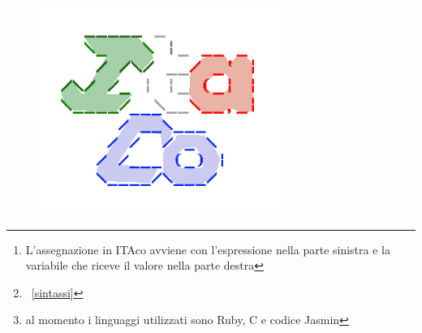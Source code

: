 \documentclass[11pt, a4paper, twoside, notitlepage]{report}
\begin{document}
\thispagestyle{empty} %
\clearpage
\begin{figure}[h] \hspace*{140pt}
\includegraphics[scale=0.5]{img/itaco_logo.png}
\end{figure}
\begin{abstract}
Questo documento riassume brevemente le peculiarità principali del progetto
ITAco da un punto di vista interessato alla dimostrazione ai fini accademici
delle competenze acquisite dagli autori dello stesso nell'ambito della creazione
di linguaggi e compilatori.
\\Il nome è stato scelto seguendo l'idea iniziale di creare un linguaggio di
programmazione molto semplice e intuitivo in lingua italiana, affinché possa
essere facile da utilizzare e didatticamente proficuo per delle categorie di
utenti che possono incontrare difficoltà nella memorizzazione di parole chiave
in lingua straniera.
\\Con lo scopo di perseguire questo obiettivo sono state prese decisioni quali
l'inversione del normale assegnamento dei valori\footnote{L'assegnazione in
ITAco avviene con l'espressione nella parte sinistra e la variabile che riceve
il valore nella parte destra}, che, sebbene risulti a un primo impatto
sconveniente a un utente abituato ad altri linguaggio di programmazione, è
tuttavia molto più intuitivo per un utente abituato ad utilizzare la logica
\emph{della calcolatrice} dove prima si inseriscono i valori e
successivamente li si assegna a una varabile.
\\Altre caratteristiche con questo obiettivo possono essere lette nella sezione
riguardante la sitnassi\footnote{~\ref{sintassi}}. Nell'ambito della facilità di
utilizzo rientrano le scelte di una intuitiva interfaccia grafica mentre,
nell'ambito didattico, la possibilità di traduttre il programma scritto in
diversi linguaggi\footnote{al momento i linguaggi utilizzati sono Ruby, C e
codice Jasmin}.
Questi argomenti sono descritti rispettivamente nella sezione ~\ref{gui} e al capitolo ~\ref{back_end}.
\\Viene inoltre descritto anche l'utilizzo gli strumenti, sia teorici che
pratici, utilizzati per la realizzazione del progetto quali JFlex, CUP, le produzioni
della grammatica utilizzata, i test automatici.

\begin{flushright}
{\bf Keywords:} Compilatori, Cup, JFlex
\end{flushright}
\end{abstract}
\end{document}
